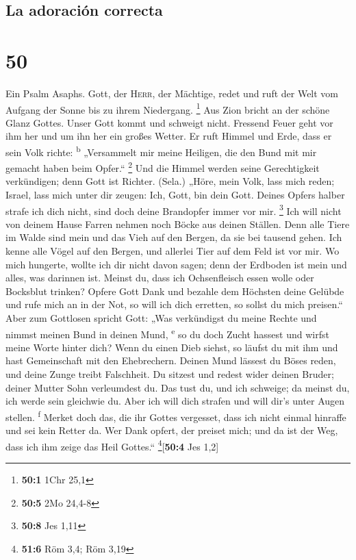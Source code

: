 \hypertarget{la-adoraciuxf3n-correcta}{%
\subsection{La adoración correcta}\label{la-adoraciuxf3n-correcta}}

\hypertarget{section-49}{%
\section{50}\label{section-49}}

 Ein Psalm Asaphs. Gott, der \textsc{Herr}, der Mächtige,
redet und ruft der Welt vom Aufgang der Sonne bis zu ihrem Niedergang.
\footnote{\textbf{50:1} 1Chr 25,1}  Aus Zion bricht an der
schöne Glanz Gottes.  Unser Gott kommt und schweigt nicht.
Fressend Feuer geht vor ihm her und um ihn her ein großes Wetter.
 Er ruft Himmel und Erde, dass er sein Volk richte:
\textsuperscript{b}  „Versammelt mir meine Heiligen, die
den Bund mit mir gemacht haben beim Opfer.`` \footnote{\textbf{50:5} 2Mo
  24,4-8}  Und die Himmel werden seine Gerechtigkeit
verkündigen; denn Gott ist Richter. (Sela.)  „Höre, mein
Volk, lass mich reden; Israel, lass mich unter dir zeugen: Ich, Gott,
bin dein Gott.  Deines Opfers halber strafe ich dich
nicht, sind doch deine Brandopfer immer vor mir. \footnote{\textbf{50:8}
  Jes 1,11}  Ich will nicht von deinem Hause Farren nehmen
noch Böcke aus deinen Ställen.  Denn alle Tiere im Walde
sind mein und das Vieh auf den Bergen, da sie bei tausend gehen.
 Ich kenne alle Vögel auf den Bergen, und allerlei Tier
auf dem Feld ist vor mir.  Wo mich hungerte, wollte ich
dir nicht davon sagen; denn der Erdboden ist mein und alles, was
darinnen ist.  Meinst du, dass ich Ochsenfleisch essen
wolle oder Bocksblut trinken?  Opfere Gott Dank und
bezahle dem Höchsten deine Gelübde  und rufe mich an in
der Not, so will ich dich erretten, so sollst du mich preisen.``
 Aber zum Gottlosen spricht Gott: „Was verkündigst du
meine Rechte und nimmst meinen Bund in deinen Mund, \textsuperscript{e}
 so du doch Zucht hassest und wirfst meine Worte hinter
dich?  Wenn du einen Dieb siehst, so läufst du mit ihm
und hast Gemeinschaft mit den Ehebrechern.  Deinen Mund
lässest du Böses reden, und deine Zunge treibt Falschheit.
 Du sitzest und redest wider deinen Bruder; deiner Mutter
Sohn verleumdest du.  Das tust du, und ich schweige; da
meinst du, ich werde sein gleichwie du. Aber ich will dich strafen und
will dir's unter Augen stellen. \textsuperscript{f} 
Merket doch das, die ihr Gottes vergesset, dass ich nicht einmal
hinraffe und sei kein Retter da.  Wer Dank opfert, der
preiset mich; und da ist der Weg, dass ich ihm zeige das Heil Gottes.``
\footnote{\textbf{51:6} Röm 3,4; Röm 3,19}{[}\textbf{50:4} Jes 1,2{]}

